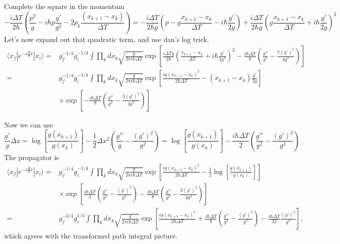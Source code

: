Complete the square in the momentum
\begin{equation}
-\frac{i\Delta T}{2\hbar}\left(\frac{p^2}{g} - i\hbar p\frac{g'}{g^2}  -2p_k\frac{(x_{k+1}-x_k)}{\Delta T} \right) = -\frac{i\Delta T}{2\hbar g}\left(p - g\frac{x_{k+1}-x_k}{\Delta T} - i\hbar \frac{g'}{2g}\right) +\frac{i\Delta T}{2\hbar g}\left(g\frac{x_{k+1}-x_k}{\Delta T} + i\hbar\frac{g'}{2g}\right)^2
\end{equation}
Let's now expand out that quadratic term, and use dan's log trick.  
\begin{align}
\langle x_f| e^{-i\frac{H}{\hbar}t} |x_i\rangle =& g_f^{-1/4}g_i^{-1/4}\int\prod_k dx_k\sqrt{\frac{g}{2\pi i\hbar\Delta T}}
\exp\left[\frac{i\Delta T g }{2\hbar }\left(\frac{x_{k+1}-x_k}{\Delta T} + i\hbar\frac{g'}{2g^2}\right)^2 -\frac{i\hbar\Delta T}{8} \left(\frac{g''}{g^{2}}- \frac{7(g')^2}{4g^{3}}\right)\right]\\
=& g_f^{-1/4}g_i^{-1/4}\int\prod_k dx_k\sqrt{\frac{g}{2\pi i\hbar\Delta T}}
\exp\left[\frac{ig (x_{k+1}-x_k)^2}{2\hbar\Delta T } -(x_{k+1}-x_k)\frac{g'}{2g}\right]\nonumber\\
&\times\exp\left[ -\frac{i\hbar\Delta T}{8} \left(\frac{g''}{g^{2}}- \frac{3(g')^2}{4g^{3}}\right)\right]
\end{align}

Now we can use 
\begin{equation}
\frac{g'}{g}\Delta x = \log\left[\frac{g(x_{k+1})}{g(x_k)}\right]  -\frac{1}{2}\Delta x^2\left(\frac{g''}{g} -\frac{(g')^2}{g^2}\right) = \log\left[\frac{g(x_{k+1})}{g(x_k)}\right]  -\frac{i\hbar\Delta T}{2}\left(\frac{g''}{g^2} -\frac{(g')^2}{g^3}\right)
\end{equation}
The propagator is 
\begin{align}
\langle x_f| e^{-i\frac{H}{\hbar}t} |x_i\rangle =& g_f^{-1/4}g_i^{-1/4}\int\prod_k dx_k\sqrt{\frac{g}{2\pi i\hbar\Delta T}}
\exp\left[\frac{ig (x_{k+1}-x_k)^2}{2\hbar\Delta T } -\frac{1}{2}\log\left[\frac{g(x_{k+1})}{g(x_k)}\right] \right]\nonumber\\
&\times\exp\left[ \frac{i\hbar\Delta T}{4}\left(\frac{g''}{g^2} -\frac{(g')^2}{g^3}\right) -\frac{i\hbar\Delta T}{8} \left(\frac{g''}{g^{2}}- \frac{3(g')^2}{4g^{3}}\right)\right]\\
=& g_f^{-3/4}g_i^{1/4}\int\prod_k dx_k\sqrt{\frac{g}{2\pi i\hbar\Delta T}}
\exp\left[\frac{ig (x_{k+1}-x_k)^2}{2\hbar\Delta T }+ \frac{i\hbar\Delta T}{8}\left(\frac{g''}{g^2} -\frac{(g')^2}{g^3}\right) -\frac{i\hbar\Delta T}{32}\frac{(g')^2}{g^3}\right],
\end{align}
which agrees with the transformed path integral picture.  


